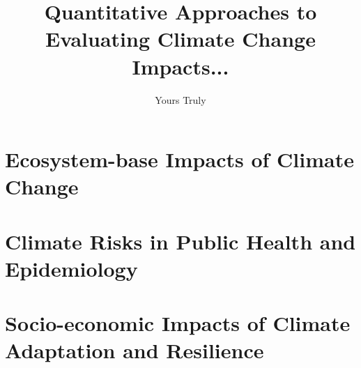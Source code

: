 \documentclass[krantz1,ChapterTOCs]{krantz}
\begin{document}
\frontmatter

\title{Quantitative Approaches to Evaluating Climate Change Impacts... 
}
\author{Yours Truly}

\maketitle

%
\setcounter{page}{7} %
\tableofcontents
%
%
\listoffigures
\listoftables
%
%

\mainmatter

\part{Ecosystem-base Impacts of Climate Change}

%

\part{Climate Risks in Public Health and Epidemiology}

\part{Socio-economic Impacts of Climate Adaptation and Resilience}






\printindex
\end{document}
